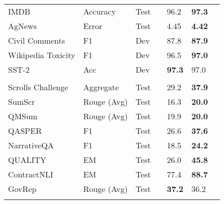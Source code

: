 \documentclass[10pt]{article}
\begin{document}
\begin{center}
\begin{longtable}{lllllll}
       \\
     IMDB & Accuracy & Test & \citeauthor{yang2019xlnet} &96.2 &  \textbf{97.3} \\ 
    AgNews & Error & Test & \citeauthor{yang2019xlnet} &4.45  &  \textbf{4.42} \\ 
    Civil Comments & F1 & Dev & \citeauthor{tay2021pre} & 87.8 & \textbf{87.9}\\
    Wikipedia Toxicity & F1 & Dev & \citeauthor{tay2021pre}  & 96.5 & \textbf{97.0} \\
    SST-2 & Acc & Dev & \citeauthor{raffel2019exploring} & \textbf{97.3} & 97.0 \\
    \\
    Scrolls Challenge & Aggregate & Test & \citeauthor{shaham2022scrolls} &  29.2 & \textbf{37.9} \\
    SumScr & Rouge (Avg) & Test & \citeauthor{shaham2022scrolls} & 16.3 & \textbf{20.0}   \\
    QMSum & Rouge (Avg) & Test & \citeauthor{shaham2022scrolls} & 19.9 & \textbf{20.0} \\ 
    QASPER & F1 & Test & \citeauthor{shaham2022scrolls}  & 26.6& \textbf{37.6} \\  
    NarrativeQA & F1 & Test & \citeauthor{shaham2022scrolls}  & 18.5& \textbf{24.2}\\
    QUALITY & EM & Test & \citeauthor{shaham2022scrolls}   & 26.0 & \textbf{45.8}  \\
    ContractNLI & EM & Test & \citeauthor{shaham2022scrolls}  & 77.4 & \textbf{88.7} \\
     GovRep & Rouge (Avg) & Test & \citeauthor{shaham2022scrolls}  & \textbf{37.2} & 36.2\\ 
    \\


\end{longtable}
\end{center}
\end{document}

